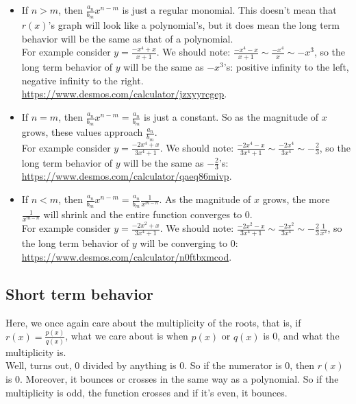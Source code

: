 \begin{itemize}
\item If $n>m$, then $\frac{a_n}{b_m}x^{n-m}$ is just a regular monomial.  This doesn't mean that $r(x)$'s graph will look like a polynomial's, but it does mean the long term behavior will be the same as that of a polynomial.\\

For example consider $y=\frac{-x^4+x}{x+1}$.  We should note: $\frac{-x^4-x}{x+1}\sim\frac{-x^4}{x}
\sim -x^3$, so the long term behavior of $y$ will be the same as $-x^3$'s:  positive infinity to the left, negative infinity to the right.  \url{https://www.desmos.com/calculator/jzxyyrcgep}.

\item If $n=m$, then $\frac{a_n}{b_m}x^{n-m}=\frac{a_n}{b_m}$ is just a constant.  So as the magnitude of $x$ grows, these values approach $\frac{a_n}{b_m}$.\\

For example consider $y=\frac{-2x^4+x}{3x^4+1}$.  We should note: $\frac{-2x^4-x}{3x^4+1}\sim\frac{-2x^4}{3x^4}
\sim -\frac{2}{3}$, so the long term behavior of $y$ will be the same as $-\frac{2}{3}$'s:   \url{https://www.desmos.com/calculator/qaeq86mivp}.
 
\item If $n<m$, then $\frac{a_n}{b_m}x^{n-m}=\frac{a_n}{b_m}\frac{1}{x^{m-n}}$.  As the magnitude of $x$ grows, the more $\frac{1}{x^{m-n}}$ will shrink and the entire function converges to 0.\\

For example consider $y=\frac{-2x^2+x}{3x^4+1}$.  We should note: $\frac{-2x^2-x}{3x^4+1}\sim\frac{-2x^2}{3x^4}
\sim -\frac{2}{3}\frac{1}{x^2}$, so the long term behavior of $y$ will be converging to 0:   \url{https://www.desmos.com/calculator/n0ftbxmcod}.
 
 
\end{itemize}


\subsection{Short term behavior}

Here, we once again care about the multiplicity of the roots, that is, if $r(x)=\frac{p(x)}{q(x)}$, what we care about is when $p(x)$ or $q(x)$ is 0, and what the multiplicity is.\\

Well, turns out, 0 divided by anything is 0.  So if the numerator is 0, then $r(x)$ is 0.  Moreover, it bounces or crosses in the same way as a polynomial.  So if the multiplicity is odd, the function crosses and if it's even, it bounces.\\


